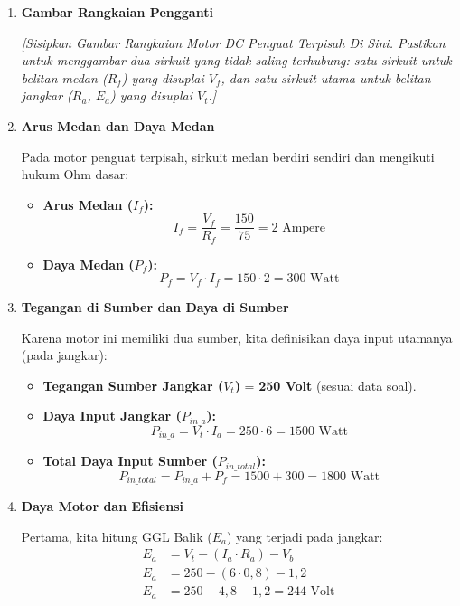 \documentclass[12pt, a4paper]{article}
\begin{document}
\begin{enumerate}[label=\alph*.]
    \item \textbf{Gambar Rangkaian Pengganti}

    \textit{[Sisipkan Gambar Rangkaian Motor DC Penguat Terpisah Di Sini. Pastikan untuk menggambar dua sirkuit yang tidak saling terhubung: satu sirkuit untuk belitan medan ($R_f$) yang disuplai $V_f$, dan satu sirkuit utama untuk belitan jangkar ($R_a$, $E_a$) yang disuplai $V_t$.]}

    \vspace{0.3cm}

    \item \textbf{Arus Medan dan Daya Medan}

    Pada motor penguat terpisah, sirkuit medan berdiri sendiri dan mengikuti hukum Ohm dasar:
    \begin{itemize}
        \item \textbf{Arus Medan ($I_f$):}
        \[
            I_f = \frac{V_f}{R_f} = \frac{150}{75} = 2 \text{ Ampere}
        \]
        \item \textbf{Daya Medan ($P_f$):}
        \[
            P_f = V_f \cdot I_f = 150 \cdot 2 = 300 \text{ Watt}
        \]
    \end{itemize}

    \vspace{0.3cm}

    \item \textbf{Tegangan di Sumber dan Daya di Sumber}

    Karena motor ini memiliki dua sumber, kita definisikan daya input utamanya (pada jangkar):
    \begin{itemize}
        \item \textbf{Tegangan Sumber Jangkar ($V_t$)} = \textbf{250 Volt} (sesuai data soal).
        \item \textbf{Daya Input Jangkar ($P_{in\_a}$):}
        \[
            P_{in\_a} = V_t \cdot I_a = 250 \cdot 6 = 1500 \text{ Watt}
        \]
        \item \textbf{Total Daya Input Sumber ($P_{in\_total}$):}
        \[
            P_{in\_total} = P_{in\_a} + P_f = 1500 + 300 = 1800 \text{ Watt}
        \]
    \end{itemize}

    \vspace{0.3cm}

    \item \textbf{Daya Motor dan Efisiensi}

    Pertama, kita hitung GGL Balik ($E_a$) yang terjadi pada jangkar:
    \begin{align*}
        E_a &= V_t - (I_a \cdot R_a) - V_b \\
        E_a &= 250 - (6 \cdot 0,8) - 1,2 \\
        E_a &= 250 - 4,8 - 1,2 = 244 \text{ Volt}
    \end{align*}


\end{enumerate}
\end{document}
